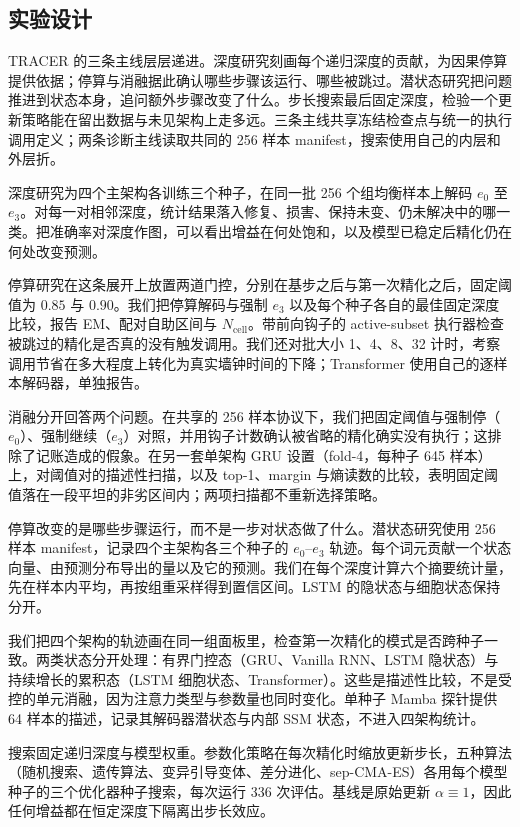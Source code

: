 \documentclass[12pt,a4paper]{article}
\begin{document}
\subsection{实验设计}
TRACER 的三条主线层层递进。深度研究刻画每个递归深度的贡献，为因果停算提供依据；停算与消融据此确认哪些步骤该运行、哪些被跳过。潜状态研究把问题推进到状态本身，追问额外步骤改变了什么。步长搜索最后固定深度，检验一个更新策略能在留出数据与未见架构上走多远。三条主线共享冻结检查点与统一的执行调用定义；两条诊断主线读取共同的 256 样本 manifest，搜索使用自己的内层和外层折。

深度研究为四个主架构各训练三个种子，在同一批 256 个组均衡样本上解码 $e_0$ 至 $e_3$。对每一对相邻深度，统计结果落入修复、损害、保持未变、仍未解决中的哪一类。把准确率对深度作图，可以看出增益在何处饱和，以及模型已稳定后精化仍在何处改变预测。

停算研究在这条展开上放置两道门控，分别在基步之后与第一次精化之后，固定阈值为 $0.85$ 与 $0.90$。我们把停算解码与强制 $e_3$ 以及每个种子各自的最佳固定深度比较，报告 EM、配对自助区间与 $N_{\mathrm{cell}}$。带前向钩子的 active-subset 执行器检查被跳过的精化是否真的没有触发调用。我们还对批大小 1、4、8、32 计时，考察调用节省在多大程度上转化为真实墙钟时间的下降；Transformer 使用自己的逐样本解码器，单独报告。

消融分开回答两个问题。在共享的 256 样本协议下，我们把固定阈值与强制停（$e_0$）、强制继续（$e_3$）对照，并用钩子计数确认被省略的精化确实没有执行；这排除了记账造成的假象。在另一套单架构 GRU 设置（fold-4，每种子 645 样本）上，对阈值对的描述性扫描，以及 top-1、margin 与熵读数的比较，表明固定阈值落在一段平坦的非劣区间内；两项扫描都不重新选择策略。

停算改变的是哪些步骤运行，而不是一步对状态做了什么。潜状态研究使用 256 样本 manifest，记录四个主架构各三个种子的 $e_0$--$e_3$ 轨迹。每个词元贡献一个状态向量、由预测分布导出的量以及它的预测。我们在每个深度计算六个摘要统计量，先在样本内平均，再按组重采样得到置信区间。LSTM 的隐状态与细胞状态保持分开。

我们把四个架构的轨迹画在同一组面板里，检查第一次精化的模式是否跨种子一致。两类状态分开处理：有界门控态（GRU、Vanilla RNN、LSTM 隐状态）与持续增长的累积态（LSTM 细胞状态、Transformer）。这些是描述性比较，不是受控的单元消融，因为注意力类型与参数量也同时变化。单种子 Mamba 探针提供 64 样本的描述，记录其解码器潜状态与内部 SSM 状态，不进入四架构统计。

搜索固定递归深度与模型权重。参数化策略在每次精化时缩放更新步长，五种算法（随机搜索、遗传算法、变异引导变体、差分进化、sep-CMA-ES）各用每个模型种子的三个优化器种子搜索，每次运行 336 次评估。基线是原始更新 $\alpha\equiv1$，因此任何增益都在恒定深度下隔离出步长效应。
\end{document}
